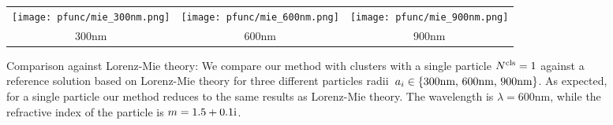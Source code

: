 \begin{figure}
    \centering
    \setlength{\resLen}{1.15in}
    \addtolength{\tabcolsep}{-6pt}
    \begin{tabular}{ccc}
        \texttt{[image: pfunc/mie\_300nm.png]} & 
        \texttt{[image: pfunc/mie\_600nm.png]} &  
        \texttt{[image: pfunc/mie\_900nm.png]}  
        \\
        300nm & 600nm & 900nm
    \end{tabular}
    \caption{\label{fig:mie}
    Comparison against Lorenz-Mie theory: We compare our method with clusters with a single particle ${N^\text{cls}}=1$ against a reference solution based on Lorenz-Mie theory for three different particles radii~$a_i \in \{ \text{300nm, 600nm, 900nm} \}$. As expected, for a single particle our method reduces to the same results as Lorenz-Mie theory. The wavelength is $\lambda=600$nm, while the refractive index of the particle is $m=1.5+0.1\text{i}$.  
}
\end{figure}
